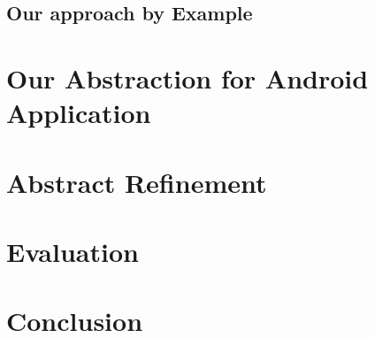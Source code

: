 \documentclass{article}
\begin{document}
\subsection{Our approach by Example}


\section{Our Abstraction for Android Application}
\label{sec:ticcg}

\section{Abstract Refinement}
\label{sec:cegar}

\section{Evaluation}
\label{sec:eval}

\section{Conclusion}
\label{sec:conclude}

%
%


 
\end{document}

